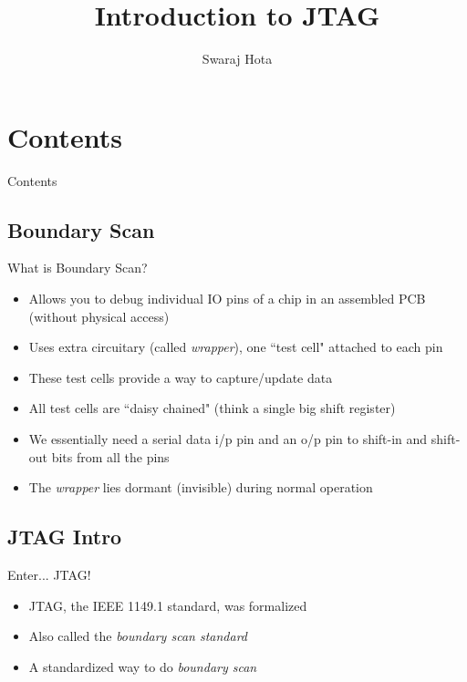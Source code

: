 \documentclass{beamer}
\title{Introduction to JTAG}
\author{Swaraj Hota}
\date
\begin{document}
{
    \frame{\titlepage}
}

\section*{Contents}

\begin{frame}{Contents}
    \tableofcontents
\end{frame}

\subsection{Boundary Scan}

\begin{frame}{What is Boundary Scan?}
    \begin{itemize}
    \item Allows you to debug individual IO pins of a chip in an assembled PCB
        (without physical access)
    \item Uses extra circuitary (called \textit{wrapper}), one ``test cell" attached to each pin
    \item These test cells provide a way to capture/update data
    \item All test cells are ``daisy chained" (think a single big shift register)
    \item We essentially need a serial data i/p pin and an o/p pin to shift-in 
            and shift-out bits from all the pins
    \item The \emph{wrapper} lies dormant (invisible) during normal operation 
    \end{itemize}
\end{frame}

\subsection{JTAG Intro}

\begin{frame}{Enter... JTAG!}
    \begin{itemize}
    \item JTAG, the IEEE 1149.1 standard, was formalized
    \item Also called the \emph{boundary scan standard} 
    \item A standardized way to do \emph{boundary scan}
    \end{itemize}
\end{frame}
\end{document}
